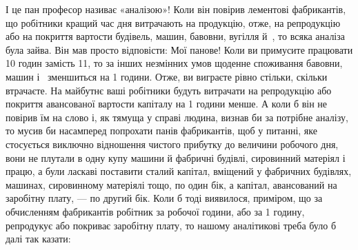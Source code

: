 І це пан професор називає «аналізою»! Коли він повірив лементові фабрикантів, що робітники кращий
час дня витрачають
на продукцію, отже, на репродукцію або на покриття вартости будівель, машин, бавовни, вугілля й~, то всяка аналіза
була зайва. Він мав просто відповісти: Мої панове! Коли ви примусите працювати 10 годин замість 11, то за інших незмінних
умов щоденне споживання бавовни, машин і~ зменшиться на 1 години. Отже, ви виграєте
рівно стільки, скільки втрачаєте. На майбутнє ваші робітники будуть витрачати на репродукцію
або покриття авансованої вартости капіталу на 1 години менше. А коли б він не повірив їм на
слово і, як тямуща у справі людина, визнав би за потрібне аналізу, то мусив би насамперед попрохати
панів фабрикантів, щоб у питанні, яке стосується
виключно відношення чистого прибутку до величини робочого дня, вони не плутали в одну купу машини й
фабричні будівлі,
сировинний матеріял і працю, а були ласкаві поставити сталий капітал, вміщений у фабричних будівлях,
машинах, сировинному матеріялі тощо, по один бік, а капітал, авансований на заробітну
плату, — по другий бік. Коли б тоді виявилося, приміром, що за обчисленням фабрикантів робітник за
 робочої години, або за 1 годину, репродукує або покриває заробітну плату, то нашому
аналітикові треба було б далі так казати:

